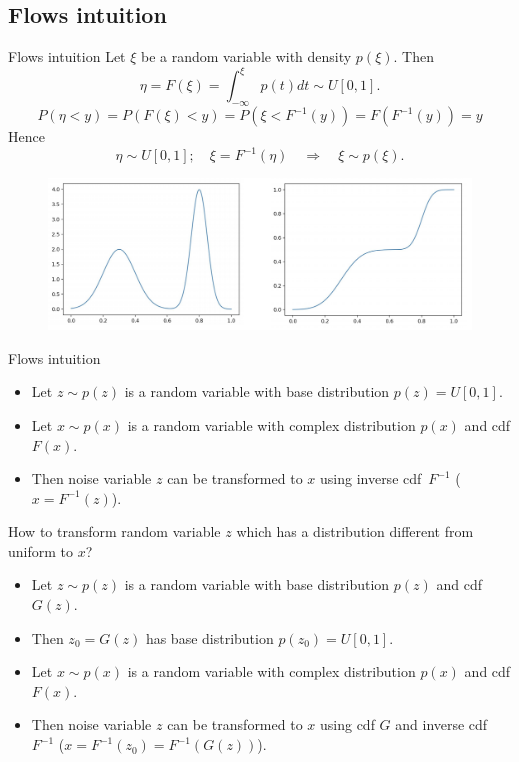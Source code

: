 \documentclass{beamer}
\begin{document}
\subsection{Flows intuition}
\begin{frame}{Flows intuition}
	Let $\xi$ be a random variable with density $p(\xi)$. Then
	\[
	\eta = F(\xi) = \int_{-\infty}^\xi p(t)dt \sim U[0, 1].
	\]
	\[
	P(\eta < y) = P(F(\xi) < y) = P(\xi < F^{-1}(y)) = F(F^{-1}(y)) = y
	\]
	Hence
	\[
	\eta \sim U[0, 1]; \quad \xi = F^{-1}(\eta) \quad \Rightarrow \quad \xi \sim p(\xi).
	\]
	\begin{figure}
		\includegraphics[width=\linewidth]{figs/flows_1d}
	\end{figure}
	
\end{frame}
\begin{frame}{Flows intuition}
	\begin{itemize}
		\item Let $z \sim p(z)$ is a random variable with base distribution $p(z) = U[0, 1]$. 
		\item Let $x \sim p(x)$ is a random variable with complex distribution $p(x)$ and cdf $F(x)$. 
		\item Then noise variable $z$ can be transformed to $x$ using inverse cdf~$F^{-1}$ ($x = F^{-1}(z)$).
	\end{itemize}
	How to transform random variable $z$  which has a distribution different from uniform to $x$?
	\begin{itemize}
		\item Let $z \sim p(z)$ is a random variable with base distribution $p(z)$ and cdf $G(z)$.
		\item Then $z_0 = G(z)$ has base distribution $p(z_0) = U[0, 1]$.
		\item Let $x \sim p(x)$ is a random variable with complex distribution $p(x)$ and cdf $F(x)$. 
		\item Then noise variable $z$ can be transformed to $x$ using cdf $G$ and inverse cdf~$F^{-1}$ ($x = F^{-1}(z_0) = F^{-1}(G(z))$).
	\end{itemize}
\end{frame}
\end{document}
